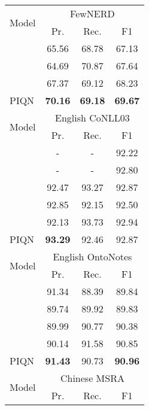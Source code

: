 \documentclass[11pt]{article}
\begin{document}
\begin{table}[!h]
\centering
\small
\begin{tabular}{lccc}

\toprule
\multirow{2}{*}{Model}   & \multicolumn{3}{c}{FewNERD}  \\
 \cmidrule(lr){2-4} 
& Pr.  & Rec. & F1  \\
\midrule

\citet{ding-etal-2021-nerd}  & 65.56 & 68.78 & 67.13 \\
\citet{shen2021locateandlabel}  & 64.69    &    70.87     &   67.64  \\
\citet{tan2021sequencetoset}  &  67.37  & 69.12 & 68.23    \\
\midrule
PIQN    & \textbf{70.16} & \textbf{69.18} & \textbf{69.67}  \\

\toprule
\multirow{2}{*}{Model}   & \multicolumn{3}{c}{English CoNLL03}  \\
 \cmidrule(lr){2-4} 
& Pr.  & Rec. & F1  \\
\midrule

\citet{peters-etal-2018-deep} & -  & -  & 92.22 \\
\citet{devlin-etal-2019-bert} & -  & -  & 92.80 \\
\citet{li-etal-2020-unified} & 92.47 & 93.27 & 92.87 \\
\citet{yu-etal-2020-named} & 92.85 &  92.15 & 92.50     \\
\citet{shen2021locateandlabel} & 92.13  & {93.73}  & 92.94  \\
\midrule
PIQN    & \textbf{93.29}  & 92.46  & 92.87  \\
\toprule
\multirow{2}{*}{Model}   & \multicolumn{3}{c}{English OntoNotes}  \\
 \cmidrule(lr){2-4} 
& Pr.  & Rec. & F1  \\
\midrule

\citet{li-etal-2020-unified} & 91.34 & 88.39 & 89.84 \\
\citet{yu-etal-2020-named} & 89.74 &  89.92 & 89.83     \\
\citet{yan2021bartner} & 89.99 &  90.77  & 90.38\\
\citet{xu-etal-2021-better} & 90.14  & 91.58  & 90.85     \\
\midrule
PIQN    &  \textbf{91.43}  & 90.73  & \textbf{90.96}  \\

\toprule
\multirow{2}{*}{Model}   & \multicolumn{3}{c}{Chinese MSRA}  \\
 \cmidrule(lr){2-4} 
& Pr.  & Rec. & F1  \\
\midrule


\end{tabular}
\end{table}
\end{document}
